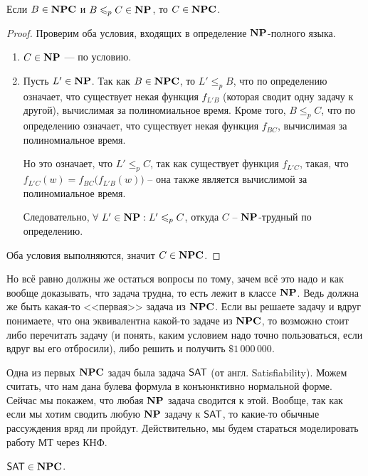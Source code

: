 \begin{Lemma}
Если $B \in \mathbf{NPC}$ и $B \leqslant_p C \in \mathbf{NP}$, то $C \in \mathbf{NPC}$.
\end{Lemma}
\begin{proof}
  Проверим оба условия, входящих в определение $\mathbf{NP}$-полного языка.
  \begin{enumerate}
    \item $C \in \mathbf{NP}$ --- по условию.
    \item Пусть $L' \in \mathbf{NP}$. Так как $B \in \mathbf{NPC}$, то $L' 
    \leqslant_p B$, что по определению означает, что существует некая 
    функция $f_{L'B}$
    (которая сводит одну задачу к другой), вычислимая за полиномиальное 
    время. Кроме того, $B \leqslant_p C$, что по определению означает, что 
    существует некая функция $f_{BC}$, вычислимая за полиномиальное время.
        
    Но это означает, что $L' \leqslant_p C$, так как существует функция 
    $f_{L'C}$, такая, что $f_{L'C}(w) = f_{BC}\big(f_{L'B}(w)\big)$ -- она 
    также является вычислимой за полиномиальное время.
        
    Следовательно, $\forall\ L' \in \mathbf{NP}: L' \leqslant_p C$, откуда 
    $C$ -- $\mathbf{NP}$-трудный по определению.
  \end{enumerate}
  Оба условия выполняются, значит $C \in \mathbf{NPC}$.
\end{proof}

Но всё равно должны же остаться вопросы по тому, зачем всё это надо и как
вообще доказывать, что задача трудна, то есть лежит в классе $\mathbf{NP}$. 
Ведь должна же быть какая-то <<первая>> задача из $\mathbf{NPC}$. Если вы решаете
задачу и вдруг понимаете, что она эквивалентна какой-то задаче из $\mathbf{NPC}$,
то возможно стоит либо перечитать задачу (и понять, каким условием
надо точно пользоваться, если вдруг вы его отбросили),
либо решить и получить $\$1\,000\,000$.

Одна из первых $\mathbf{NPC}$ задач была задача $\mathsf{SAT}$ (от англ.
Satisfiability). Можем считать, что нам
дана булева формула в конъюнктивно нормальной форме. Сейчас мы покажем, что
любая $\mathbf{NP}$ задача сводится к этой. Вообще, так как если мы хотим сводить
любую $\mathbf{NP}$ задачу к $\mathsf{SAT}$, то какие-то обычные рассуждения вряд ли пройдут.
Действительно, мы будем стараться моделировать работу МТ через КНФ.

\begin{Theorem}
  $\mathsf{SAT} \in \mathbf{NPC}$.
\end{Theorem}


